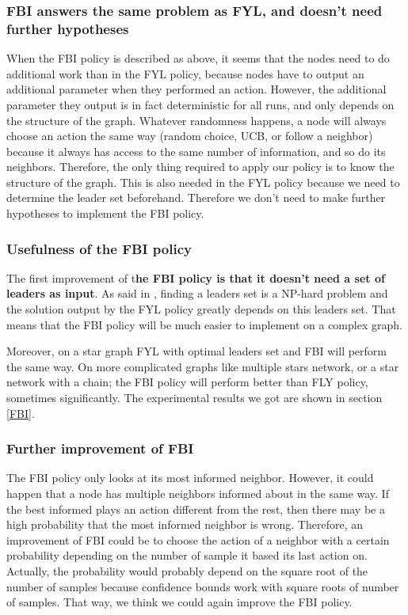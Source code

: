 \documentclass{article}
\begin{document}
\subsubsection{FBI answers the same problem as FYL, and doesn't need further hypotheses}

When the FBI policy is described as above, it seems that the nodes need to do additional work than in the FYL policy, because nodes have to output an additional parameter when they performed an action. However, the additional parameter they output is in fact deterministic for all runs, and only depends on the structure of the graph. Whatever randomness happens, a node will always choose an action the same way (random choice, UCB, or follow a neighbor) because it always has access to the same number of information, and so do its neighbors. Therefore, the only thing required to apply our policy is to know the structure of the graph. This is also needed in the FYL policy because we need to determine the leader set beforehand. Therefore we don't need to make further hypotheses to implement the FBI policy.

\subsubsection{Usefulness of the FBI policy}

The first improvement of t\textbf{he FBI policy is that it doesn't need a set of leaders as input}. As said in \cite{DBLP:journals/corr/KollaJG16}, finding a leaders set is a NP-hard problem and the solution output by the FYL policy greatly depends on this leaders set. That means that the FBI policy will be much easier to implement on a complex graph.

Moreover, on a star graph FYL with optimal leaders set and FBI will perform the same way. On more complicated graphs like multiple stars network, or a star network with a chain; the FBI policy will perform better than FLY policy, sometimes significantly. The experimental results we got are shown in section \ref{FBI}.

\subsubsection{Further improvement of FBI}

The FBI policy only looks at its most informed neighbor. However, it could happen that a node has multiple neighbors informed about in the same way. If the best informed plays an action different from the rest, then there may be a high probability that the most informed neighbor is wrong. Therefore, an improvement of FBI could be to choose the action of a neighbor with a certain probability depending on the number of sample it based its last action on. Actually, the probability would probably depend on the square root of the number of samples because confidence bounds work with square roots of number of samples. That way, we think we could again improve the FBI policy.
\end{document}
